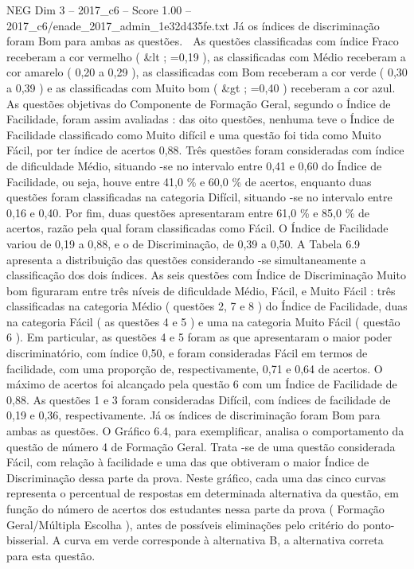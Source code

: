 \begin{textsample}{NEG Dim 3 – 2017\_c6 – Score 1.00 – 2017\_c6/enade\_2017\_admin\_1e32d435fe.txt}
Já os índices de discriminação foram Bom para ambas as questões.  As questões classificadas com índice Fraco receberam a cor vermelho ( \&lt ; =0,19 ), as classificadas com Médio receberam a cor amarelo ( 0,20 a 0,29 ), as classificadas com Bom receberam a cor verde ( 0,30 a 0,39 ) e as classificadas com Muito bom ( \&gt ; =0,40 ) receberam a cor azul.
As questões objetivas do Componente de Formação Geral, segundo o Índice de Facilidade, foram assim avaliadas : das oito questões, nenhuma teve o Índice de Facilidade classificado como Muito difícil e uma questão foi tida como Muito Fácil, por ter índice de acertos 0,88.
Três questões foram consideradas com índice de dificuldade Médio, situando -se no intervalo entre 0,41 e 0,60 do Índice de Facilidade, ou seja, houve entre 41,0 \% e 60,0 \% de acertos, enquanto duas questões foram classificadas na categoria Difícil, situando -se no intervalo entre 0,16 e 0,40.
Por fim, duas questões apresentaram entre 61,0 \% e 85,0 \% de acertos, razão pela qual foram classificadas como Fácil.
O Índice de Facilidade variou de 0,19 a 0,88, e o de Discriminação, de 0,39 a 0,50.
A Tabela 6.9 apresenta a distribuição das questões considerando -se simultaneamente a classificação dos dois índices.
As seis questões com Índice de Discriminação Muito bom figuraram entre três níveis de dificuldade Médio, Fácil, e Muito Fácil : três classificadas na categoria Médio ( questões 2, 7 e 8 ) do Índice de Facilidade, duas na categoria Fácil ( as questões 4 e 5 ) e uma na categoria Muito Fácil ( questão 6 ).
Em particular, as questões 4 e 5 foram as que apresentaram o maior poder discriminatório, com índice 0,50, e foram consideradas Fácil em termos de facilidade, com uma proporção de, respectivamente, 0,71 e 0,64 de acertos.
O máximo de acertos foi alcançado pela questão 6 com um Índice de Facilidade de 0,88.
As questões 1 e 3 foram consideradas Difícil, com índices de facilidade de 0,19 e 0,36, respectivamente.
Já os índices de discriminação foram Bom para ambas as questões.
O Gráfico 6.4, para exemplificar, analisa o comportamento da questão de número 4 de Formação Geral.
Trata -se de uma questão considerada Fácil, com relação à facilidade e uma das que obtiveram o maior Índice de Discriminação dessa parte da prova.
Neste gráfico, cada uma das cinco curvas representa o percentual de respostas em determinada alternativa da questão, em função do número de acertos dos estudantes nessa parte da prova ( Formação Geral/Múltipla Escolha ), antes de possíveis eliminações pelo critério do ponto-bisserial.
A curva em verde corresponde à alternativa B, a alternativa correta para esta questão.

\end{textsample}
